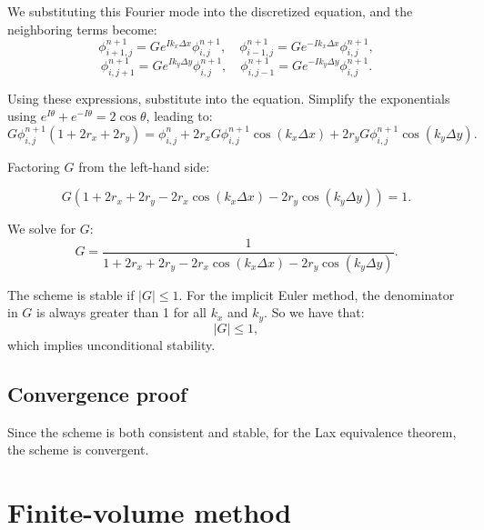 \documentclass{article}
\begin{document}
We substituting this Fourier mode into the discretized equation, and the neighboring terms become:
\begin{equation*}
\phi_{i+1,j}^{n+1} = G e^{I k_x \Delta x} \phi_{i,j}^{n+1}, \quad \phi_{i-1,j}^{n+1} = G e^{-I k_x \Delta x} \phi_{i,j}^{n+1},
\end{equation*}
\begin{equation*}
\phi_{i,j+1}^{n+1} = G e^{I k_y \Delta y} \phi_{i,j}^{n+1}, \quad \phi_{i,j-1}^{n+1} = G e^{-I k_y \Delta y} \phi_{i,j}^{n+1}.
\end{equation*}

Using these expressions, substitute into the equation. Simplify the exponentials using $ e^{I \theta} + e^{-I \theta} = 2 \cos \theta $, leading to:
\begin{equation*}
G \phi_{i,j}^{n+1} \left( 1 + 2r_x + 2r_y \right) = \phi_{i,j}^n + 2r_x G \phi_{i,j}^{n+1} \cos(k_x \Delta x) + 2r_y G \phi_{i,j}^{n+1} \cos(k_y \Delta y).
\end{equation*}

Factoring $G$ from the left-hand side:

\begin{equation*}
G \left( 1 + 2r_x + 2r_y - 2r_x \cos(k_x \Delta x) - 2r_y \cos(k_y \Delta y) \right) = 1.
\end{equation*}

We solve for $ G $:
\begin{equation*}
G = \frac{1}{1 + 2r_x + 2r_y - 2r_x \cos(k_x \Delta x) - 2r_y \cos(k_y \Delta y)}.
\end{equation*}

The scheme is stable if $ |G| \leq 1 $. For the implicit Euler method, the denominator in $ G $ is always greater than 1 for all $ k_x $ and $ k_y $. So we have that:
\begin{equation}
|G| \leq 1,
\end{equation}
which implies unconditional stability.

\subsection{Convergence proof}
Since the scheme is both consistent and stable, for the Lax equivalence theorem, the scheme is convergent.

\section{Finite-volume method}
\end{document}
